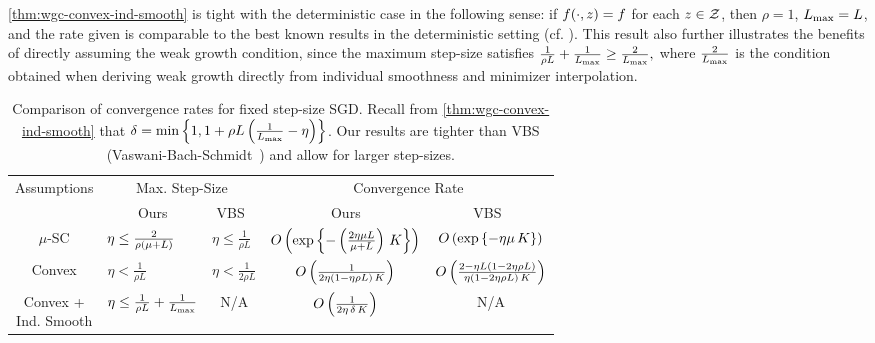 \autoref{thm:wgc-convex-ind-smooth} is tight with the deterministic case in the following sense: if \( f(\cdot, z) = f \) for each \( z \in \mathcal{Z} \), then \( \rho = 1 \), \( L_{\text{max}} = L \), and the rate given is comparable to the best known results in the deterministic setting (cf. \citet[Theorem 3.3]{bubeck2015convex}). 
This result also further illustrates the benefits of directly assuming the weak growth condition, since the maximum step-size satisfies 
\( \frac{1}{\rho L} + \frac{1}{L_{\text{max}}} \geq \frac{2}{L_{\text{max}}}, \)
where \( \frac{2}{L_{\text{max}}} \) is the condition obtained when deriving weak growth directly from individual smoothness and minimizer interpolation.
\begin{table}[t]
    \centering
    \begin{tabular}{c l l c c  }\toprule
        \multirow{2}{*}{Assumptions} & \multicolumn{2}{c}{Max. Step-Size}  & \multicolumn{2}{c}{Convergence Rate}\\%
        \cmidrule(lr){2-3} \cmidrule(l){4-5}
                 & \multicolumn{1}{c}{Ours} & \multicolumn{1}{c}{VBS~\citep{vaswani2019fast}} & \multicolumn{1}{c}{Ours} & \multicolumn{1}{c}{VBS~\citep{vaswani2019fast}}\\ \midrule
    \( \mu \)-SC & \( \eta \leq \frac{2}{\rho\left(\mu + L\right)} \)%
                 & \( \eta \leq \frac{1}{\rho L} \)%
                 & \( O\left(\exp\left\{- \left(\frac{2 \eta \mu L}{\mu + L}\right) \, K\right\}\right) \)%
                 & \( O\left(\exp\left\{- \eta \mu \, K \right\}\right) \) \\ \addlinespace
    Convex       & \( \eta < \frac{1}{\rho L} \)%
                 & \( \eta < \frac{1}{2 \rho L} \)%
                 & \( O\left(\frac{1}{2 \eta (1 - \eta \rho L) \, K}\right) \)%
                 & \( O\left(\frac{2 - \eta L\left(1 - 2 \eta \rho L\right)}{\eta (1- 2 \eta \rho L) \, K} \right) \)\\ \addlinespace 
    \makecell{Convex + \\ Ind. Smooth}%
                 & \( \eta \leq \frac{1}{\rho L} + \frac{1}{L_{\text{max}}} \)%
                 & \multicolumn{1}{c}{N/A}%
                 & \( O\left(\frac{1}{2 \eta \, \delta \, K}\right) \)%
                 & \multicolumn{1}{c}{N/A} \\ \bottomrule 
    \end{tabular}
    \caption{Comparison of convergence rates for fixed step-size SGD. Recall from \autoref{thm:wgc-convex-ind-smooth} that \( \delta = \min \left\{ 1, 1 + \rho L \left(\frac{1}{L_{\text{max}}} - \eta \right)\right\} \). Our results are tighter than VBS (Vaswani-Bach-Schmidt~\citep{vaswani2019fast}) and allow for larger step-sizes.}%
    \label{table:sgd-comparison}
\end{table}


